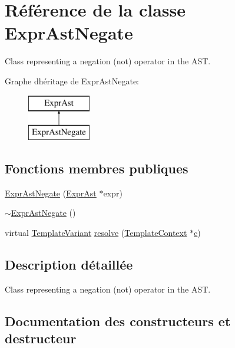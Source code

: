 \hypertarget{class_expr_ast_negate}{}\section{Référence de la classe Expr\+Ast\+Negate}
\label{class_expr_ast_negate}


Class representing a negation (not) operator in the A\+S\+T.  


Graphe d\textquotesingle{}héritage de Expr\+Ast\+Negate\+:\begin{figure}[H]
\begin{center}
\leavevmode
\includegraphics[height=2.000000cm]{class_expr_ast_negate}
\end{center}
\end{figure}
\subsection*{Fonctions membres publiques}
\begin{DoxyCompactItemize}
\item 
\hyperlink{class_expr_ast_negate_a54be01af052e421181b80147c8b93807}{Expr\+Ast\+Negate} (\hyperlink{class_expr_ast}{Expr\+Ast} $\ast$expr)
\item 
\hyperlink{class_expr_ast_negate_a06fd08b8afbd5aefec84bbabd57e1478}{$\sim$\+Expr\+Ast\+Negate} ()
\item 
virtual \hyperlink{class_template_variant}{Template\+Variant} \hyperlink{class_expr_ast_negate_a1cf3fec89cf143e2bf25aa8b38e3fb6e}{resolve} (\hyperlink{class_template_context}{Template\+Context} $\ast$\hyperlink{060__command__switch_8tcl_ab14f56bc3bd7680490ece4ad7815465f}{c})
\end{DoxyCompactItemize}


\subsection{Description détaillée}
Class representing a negation (not) operator in the A\+S\+T. 

\subsection{Documentation des constructeurs et destructeur}
\hypertarget{class_expr_ast_negate_a54be01af052e421181b80147c8b93807}{}

